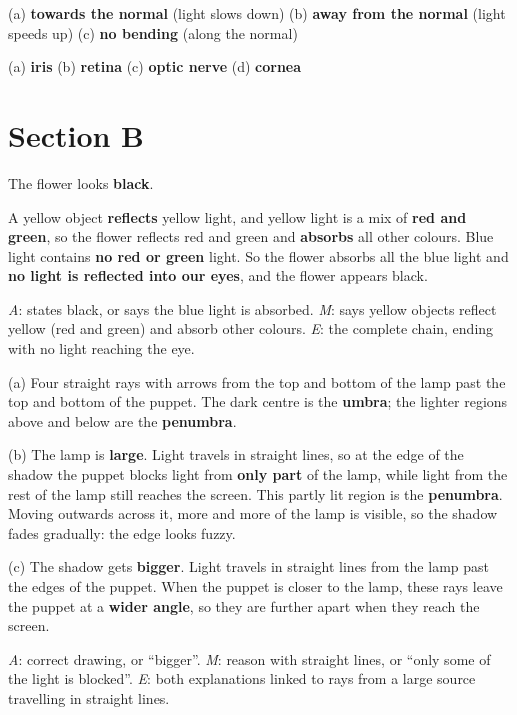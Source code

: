 \documentclass[11pt]{article}
\begin{document}
 (a) \textbf{towards the normal} (light slows down) \quad (b) \textbf{away from the normal} (light speeds up) \quad (c) \textbf{no bending} (along the normal)

 (a) \textbf{iris} \quad (b) \textbf{retina} \quad (c) \textbf{optic nerve} \quad (d) \textbf{cornea}

\section*{Section B}
 The flower looks \textbf{black}.\par
A yellow object \textbf{reflects} yellow light, and yellow light is a mix of \textbf{red and green}, so the flower reflects red and green and \textbf{absorbs} all other colours. Blue light contains \textbf{no red or green} light. So the flower absorbs all the blue light and \textbf{no light is reflected into our eyes}, and the flower appears black.\par
\emph{A}: states black, or says the blue light is absorbed. \emph{M}: says yellow objects reflect yellow (red and green) and absorb other colours. \emph{E}: the complete chain, ending with no light reaching the eye.

\begin{minipage}[t]{0.52\textwidth}
\vspace{0pt}
 (a) Four straight rays with arrows from the top and bottom of the lamp past the top and bottom of the puppet. The dark centre is the \textbf{umbra}; the lighter regions above and below are the \textbf{penumbra}.
\end{minipage}\hfill
\begin{minipage}[t]{0.44\textwidth}
\vspace{0pt}\centering\TaskPuppet[5.2mm]
\end{minipage}\par
(b) The lamp is \textbf{large}. Light travels in straight lines, so at the edge of the shadow the puppet blocks light from \textbf{only part} of the lamp, while light from the rest of the lamp still reaches the screen. This partly lit region is the \textbf{penumbra}. Moving outwards across it, more and more of the lamp is visible, so the shadow fades gradually: the edge looks fuzzy.\par
(c) The shadow gets \textbf{bigger}. Light travels in straight lines from the lamp past the edges of the puppet. When the puppet is closer to the lamp, these rays leave the puppet at a \textbf{wider angle}, so they are further apart when they reach the screen.\par
\emph{A}: correct drawing, or ``bigger''. \emph{M}: reason with straight lines, or ``only some of the light is blocked''. \emph{E}: both explanations linked to rays from a large source travelling in straight lines.
\end{document}
